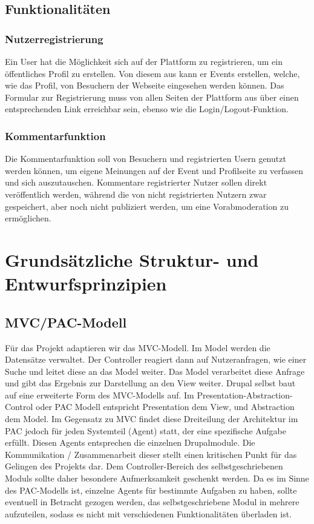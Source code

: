 \documentclass{swp}
\begin{document}
\subsection{Funktionalit\"aten}
\subsubsection{Nutzerregistrierung}
Ein User hat die M\"oglichkeit sich auf der Plattform zu registrieren, um ein \"offentliches Profil zu erstellen. Von diesem aus kann er Events erstellen, welche, wie das Profil, von Besuchern der Webseite eingesehen werden k\"onnen. Das Formular zur Registrierung muss von allen Seiten der Plattform aus \"uber einen entsprechenden Link erreichbar sein, ebenso wie die Login/Logout-Funktion.
\subsubsection{Kommentarfunktion}
Die Kommentarfunktion soll von Besuchern und registrierten Usern genutzt werden k\"onnen, um eigene Meinungen auf der Event und Profilseite zu verfassen und sich auszutauschen. Kommentare registrierter Nutzer sollen direkt ver\"offentlich werden, w\"ahrend die von nicht registrierten Nutzern zwar gespeichert, aber noch nicht publiziert werden, um eine Vorabmoderation zu erm\"oglichen.
\section{Grunds\"atzliche Struktur- und Entwurfsprinzipien}
\subsection{MVC/PAC-Modell}
F\"ur das Projekt adaptieren wir das MVC-Modell. Im Model werden die Datens\"atze verwaltet. Der Controller reagiert dann auf Nutzeranfragen, wie einer Suche und leitet diese an das Model weiter. Das Model verarbeitet diese Anfrage und gibt das Ergebnis zur Darstellung an den View weiter. Drupal selbst baut auf eine erweiterte Form des MVC-Modells auf. Im Presentation-Abstraction-Control oder PAC Modell entspricht Presentation dem View, und Abstraction dem Model. Im Gegensatz zu MVC findet diese Dreiteilung der Architektur im PAC jedoch f\"ur jeden Systemteil (\glqq Agent\grqq{}) statt, der eine spezifische Aufgabe erf\"ullt. Diesen Agents entsprechen die einzelnen Drupalmodule. Die Kommunikation / Zusammenarbeit dieser stellt einen kritischen Punkt f\"ur das Gelingen des Projekts dar. Dem Controller-Bereich des selbstgeschriebenen Moduls sollte daher besondere Aufmerksamkeit geschenkt werden. Da es im Sinne des PAC-Modells ist, einzelne \glqq Agents\grqq{} f\"ur bestimmte Aufgaben zu haben, sollte eventuell in Betracht gezogen werden, das selbstgeschriebene Modul in mehrere aufzuteilen, sodass es nicht mit verschiedenen Funktionalit\"aten \"uberladen ist.
\end{document}
